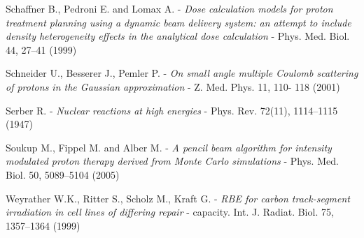 \documentclass[12pt, a4paper, twoside]{book}
\begin{document}
\begin{thebibliography}{99}
Schaffner B., Pedroni E. and Lomax A. -
\emph{Dose calculation models for proton treatment planning using a dynamic beam delivery system: an attempt to include density heterogeneity effects in the analytical dose calculation} - 
Phys. Med. Biol. 44, 27–41 (1999)

Schneider U., Besserer J., Pemler P. - 
\emph{On small angle multiple Coulomb scattering of protons in the Gaussian approximation} - 
Z. Med. Phys. 11,  110- 118 (2001)

Serber R. - 
\emph{Nuclear reactions at high energies} -
Phys. Rev. 72(11), 1114–1115 (1947)

Soukup M., Fippel M. and Alber M. -
\emph{A pencil beam algorithm for intensity modulated proton therapy derived from Monte Carlo simulations} -
Phys. Med. Biol. 50, 5089–5104 (2005)

Weyrather W.K., Ritter S., Scholz M., Kraft G. - 
\emph{RBE for carbon track-segment irradiation in cell lines of differing repair} -
capacity. Int. J. Radiat. Biol. 75, 1357–1364 (1999)



\end{thebibliography}




\end{document}
